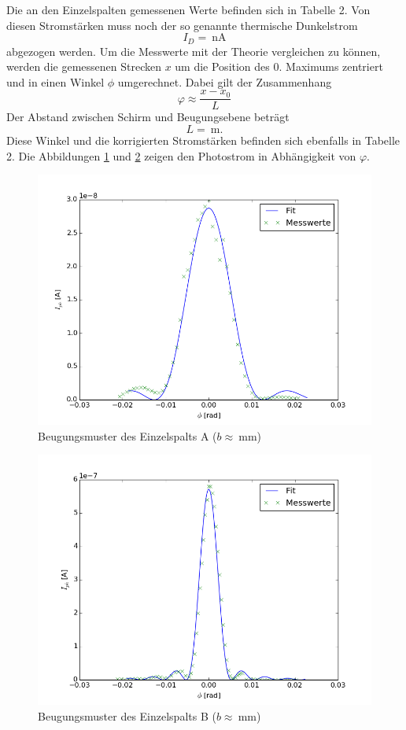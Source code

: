 \documentclass[11pt,ngerman,a4paper]{article}
\begin{document}
Die an den Einzelspalten gemessenen Werte befinden sich in Tabelle 2. Von diesen Stromstärken muss noch der so genannte thermische Dunkelstrom 
\[
I_D = \SI{}{\nano\ampere}
\]
abgezogen werden. Um die Messwerte mit der Theorie vergleichen zu können, werden die gemessenen Strecken $x$ um die Position des 0. Maximums zentriert und in einen Winkel $\phi$ umgerechnet. Dabei gilt der Zusammenhang
\[
\varphi \approx \frac{x-x_0}{L}
\] 
Der Abstand zwischen Schirm und Beugungsebene beträgt
\[
L = \SI{}{\meter} \mathrm{.}
\]
Diese Winkel und die korrigierten Stromstärken befinden sich ebenfalls in Tabelle 2. Die Abbildungen \ref{plot0} und  \ref{plot1} zeigen den Photostrom in Abhängigkeit von $\varphi$.
\begin{figure}[H]
\centering
\includegraphics[scale=0.8]{plot0.png}
\caption{Beugungsmuster des Einzelspalts A ($b \approx \SI{}{\milli\meter}$)}
\label{plot0}
\end{figure}

\begin{figure}[H]
\centering
\includegraphics[scale=0.8]{plot1.png}
\caption{Beugungsmuster des Einzelspalts B ($b \approx \SI{}{\milli\meter}$)}
\label{plot1}
\end{figure}
\end{document}
